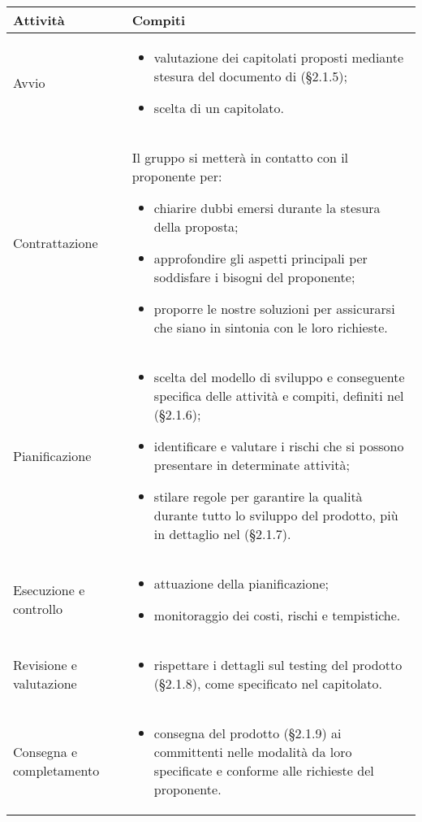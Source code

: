 \setcounter{table}{-1}
{


\centering
\renewcommand{\arraystretch}{1.5}
\begin{longtable}{C{4cm} C{11cm}}
\textbf{Attività} &
\textbf{Compiti}\\
\endhead

Avvio & \vspace{-0.5cm}
	\begin{itemize}
		\item valutazione dei capitolati proposti mediante stesura del documento di \SdFv{}(§2.1.5);
		\item scelta di un capitolato.
	\end{itemize}  \\
Contrattazione & Il gruppo si metterà in contatto con il proponente per: 
	\begin{itemize}
		\item chiarire dubbi emersi durante la stesura della proposta;
		\item approfondire gli aspetti principali per soddisfare i bisogni del proponente;
		\item proporre le nostre soluzioni per assicurarsi che siano in sintonia con le loro richieste.
	\end{itemize}  \\
Pianificazione & \vspace{-0.5cm}
	\begin{itemize}
		\item scelta del modello di sviluppo e conseguente specifica delle attività e compiti, definiti nel \PdPv{}(§2.1.6);
		\item identificare e valutare i rischi che si possono presentare in determinate attività;
		\item stilare regole per garantire la qualità durante tutto lo sviluppo del prodotto, più in dettaglio nel \PdQv{}(§2.1.7).
	\end{itemize}  \\
Esecuzione e controllo & \vspace{-0.5cm}
	\begin{itemize}
		\item attuazione della pianificazione;
		\item monitoraggio dei costi, rischi e tempistiche.
	\end{itemize}  \\
Revisione e valutazione & \vspace{-0.5cm}
	\begin{itemize}
		\item rispettare i dettagli sul testing del prodotto (§2.1.8), come specificato nel capitolato.
	\end{itemize}  \\
Consegna e completamento & \vspace{-0.5cm}
	\begin{itemize}
		\item consegna del prodotto (§2.1.9) ai committenti nelle modalità da loro specificate e conforme alle richieste del proponente.
	\end{itemize}  \\

		
\end{longtable}
}